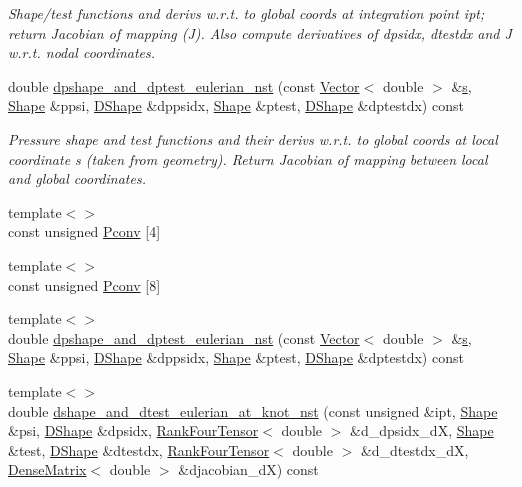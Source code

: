 \begin{DoxyCompactItemize}
\begin{DoxyCompactList}\small\item\em Shape/test functions and derivs w.\+r.\+t. to global coords at integration point ipt; return Jacobian of mapping (J). Also compute derivatives of dpsidx, dtestdx and J w.\+r.\+t. nodal coordinates. \end{DoxyCompactList}\item 
double \hyperlink{classoomph_1_1GeneralisedNewtonianQTaylorHoodElement_a631eefcbaebe7c2a3e9c2128c0fa0f6b}{dpshape\+\_\+and\+\_\+dptest\+\_\+eulerian\+\_\+nst} (const \hyperlink{classoomph_1_1Vector}{Vector}$<$ double $>$ \&\hyperlink{cfortran_8h_ab7123126e4885ef647dd9c6e3807a21c}{s}, \hyperlink{classoomph_1_1Shape}{Shape} \&ppsi, \hyperlink{classoomph_1_1DShape}{D\+Shape} \&dppsidx, \hyperlink{classoomph_1_1Shape}{Shape} \&ptest, \hyperlink{classoomph_1_1DShape}{D\+Shape} \&dptestdx) const
\begin{DoxyCompactList}\small\item\em Pressure shape and test functions and their derivs w.\+r.\+t. to global coords at local coordinate s (taken from geometry). Return Jacobian of mapping between local and global coordinates. \end{DoxyCompactList}\item 
{\footnotesize template$<$$>$ }\\const unsigned \hyperlink{classoomph_1_1GeneralisedNewtonianQTaylorHoodElement_aa706c4a6713ca3dc58c43e9dbb1341d9}{Pconv} \mbox{[}4\mbox{]}
\item 
{\footnotesize template$<$$>$ }\\const unsigned \hyperlink{classoomph_1_1GeneralisedNewtonianQTaylorHoodElement_af4e213c644cedd388ceeb2a79a362691}{Pconv} \mbox{[}8\mbox{]}
\item 
{\footnotesize template$<$$>$ }\\double \hyperlink{classoomph_1_1GeneralisedNewtonianQTaylorHoodElement_a4d94bb8e50b3f5c4a08e7913e7ea2477}{dpshape\+\_\+and\+\_\+dptest\+\_\+eulerian\+\_\+nst} (const \hyperlink{classoomph_1_1Vector}{Vector}$<$ double $>$ \&\hyperlink{cfortran_8h_ab7123126e4885ef647dd9c6e3807a21c}{s}, \hyperlink{classoomph_1_1Shape}{Shape} \&ppsi, \hyperlink{classoomph_1_1DShape}{D\+Shape} \&dppsidx, \hyperlink{classoomph_1_1Shape}{Shape} \&ptest, \hyperlink{classoomph_1_1DShape}{D\+Shape} \&dptestdx) const
\item 
{\footnotesize template$<$$>$ }\\double \hyperlink{classoomph_1_1GeneralisedNewtonianQTaylorHoodElement_a15e8e8fa9fb041edbdabb433faca1709}{dshape\+\_\+and\+\_\+dtest\+\_\+eulerian\+\_\+at\+\_\+knot\+\_\+nst} (const unsigned \&ipt, \hyperlink{classoomph_1_1Shape}{Shape} \&psi, \hyperlink{classoomph_1_1DShape}{D\+Shape} \&dpsidx, \hyperlink{classoomph_1_1RankFourTensor}{Rank\+Four\+Tensor}$<$ double $>$ \&d\+\_\+dpsidx\+\_\+dX, \hyperlink{classoomph_1_1Shape}{Shape} \&test, \hyperlink{classoomph_1_1DShape}{D\+Shape} \&dtestdx, \hyperlink{classoomph_1_1RankFourTensor}{Rank\+Four\+Tensor}$<$ double $>$ \&d\+\_\+dtestdx\+\_\+dX, \hyperlink{classoomph_1_1DenseMatrix}{Dense\+Matrix}$<$ double $>$ \&djacobian\+\_\+dX) const

\end{DoxyCompactItemize}

